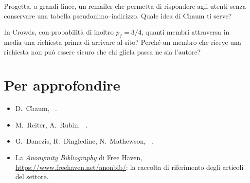 \begin{esercizio}[2]\label{es:02-penet}
Progetta, a grandi linee, un remailer che permetta di rispondere agli utenti senza conservare una tabella pseudonimo--indirizzo. Quale idea di Chaum ti serve?
\end{esercizio}

\begin{esercizio}[2]\label{es:02-crowds}
In Crowds, con probabilità di inoltro $p_f = 3/4$, quanti membri attraversa in media una richiesta prima di arrivare al sito? Perché un membro che riceve una richiesta non può essere sicuro che chi gliela passa ne sia l'autore?
\end{esercizio}

\section*{Per approfondire}
\begin{itemize}
  \item D.~Chaum, ~\cite{chaum1981untraceable}.
  \item M.~Reiter, A.~Rubin, ~\cite{reiter1998crowds}.
  \item G.~Danezis, R.~Dingledine, N.~Mathewson, ~\cite{danezis2003mixminion}.
  \item La \emph{Anonymity Bibliography} di Free Haven, \url{https://www.freehaven.net/anonbib/}: la raccolta di riferimento degli articoli del settore.
\end{itemize}
